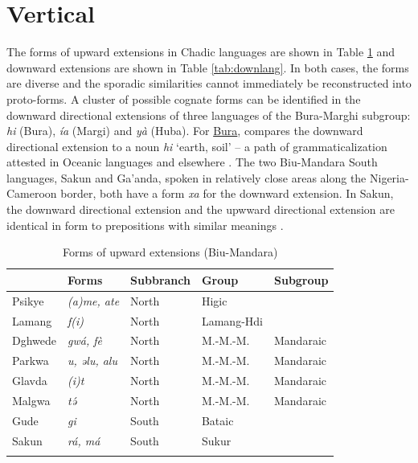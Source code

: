 \section{Vertical}

The forms of upward extensions in Chadic languages are shown in Table \ref{tab:uplang} and downward extensions are shown in Table \ref{tab:downlang}. In both cases, the forms are diverse and the sporadic similarities cannot immediately be reconstructed into proto-forms. A cluster of possible cognate forms can be identified in the downward directional extensions of three languages of the Bura-Marghi subgroup: \textit{hi} (Bura), \textit{ía} (Margi) and \textit{yà} (Huba). For \hyperref[bura]{Bura}, \citet[282]{hoffmannUntersuchungenZurStruktur1955} compares the downward directional extension to a noun \textit{hi} `earth, soil' -- a path of grammaticalization attested in Oceanic languages and elsewhere \citep[121--122]{heineWorldLexiconGrammaticalization2002}. The two Biu-Mandara South languages, Sakun and Ga'anda, spoken in relatively close areas along the Nigeria-Cameroon border, both have a form \textit{xa} for the downward extension. In Sakun, the downward directional extension and the upwward directional extension are identical in form to prepositions with similar meanings \citep[273--274]{thomasGrammarSakunSukur2014}. 

\begin{table}
	\caption{Forms of upward extensions (Biu-Mandara)}
	\label{tab:uplang}
	\begin{tabular}{lllll}
		\lsptoprule
		&     Forms    &  Subbranch & Group & Subgroup        \\
		\midrule
		Psikye&	\textit{(a)me, ate}	& North & Higic & \\
		Lamang&	\textit{f(i)} &	North & Lamang-Hdi & \\
		Dghwede&	\textit{gwá, fè} &	North & M.-M.-M. & Mandaraic \\
		Parkwa&	\textit{u, əlu, alu} &	North & M.-M.-M. & Mandaraic  \\
		Glavda&	\textit{(i)t} &	North & M.-M.-M. & Mandaraic  \\
		Malgwa&	\textit{tə́} &	North & M.-M.-M. & Mandaraic  \\
		Gude&	\textit{gi} &	South & Bataic & \\
		Sakun&	\textit{rá, má} &	South & Sukur & \\
		\lspbottomrule
	\end{tabular}
\end{table}

